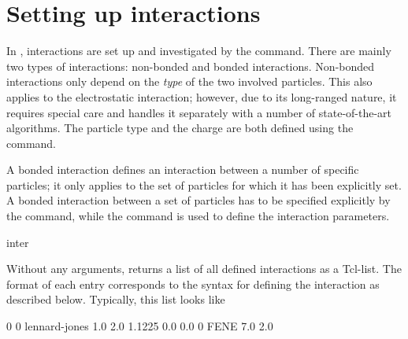 %  
%   
%  
%  
%
\chapter{Setting up interactions}
\label{sec:inter}

In \es, interactions are set up and investigated by the
 command. There are mainly two types of interactions:
non-bonded and bonded interactions. Non-bonded interactions only
depend on the \emph{type} of the two involved particles. This also
applies to the electrostatic interaction; however, due to its
long-ranged nature, it requires special care and \es handles it
separately with a number of state-of-the-art algorithms. The particle
type and the charge are both defined using the  command.

A bonded interaction defines an interaction between a number of
specific particles; it only applies to the set of particles for which
it has been explicitly set.  A bonded interaction between a set of
particles has to be specified explicitly by the 
command, while the  command is used to define the
interaction parameters.

\begin{essyntax}
  inter
\end{essyntax}
Without any arguments,  returns a list of all defined
interactions as a Tcl-list. The format of each entry corresponds to
the syntax for defining the interaction as described below. Typically,
this list looks like
\begin{tclcode}
  {0 0 lennard-jones 1.0 2.0 1.1225 0.0 0.0} {0 FENE 7.0 2.0}
\end{tclcode}


